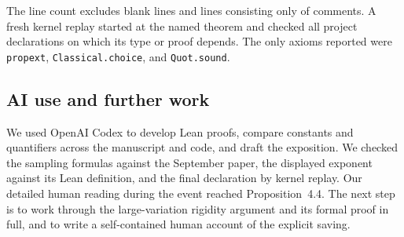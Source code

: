 \documentclass[11pt,letterpaper,oneside,reqno]{amsart}
\theoremstyle{definition}
\begin{document}
The line count excludes blank lines and lines consisting only of
comments. A fresh kernel replay started at the named theorem and checked
all project declarations on which its type or proof depends. The only
axioms reported were \texttt{propext}, \texttt{Classical.choice}, and
\texttt{Quot.sound}.

\subsection*{AI use and further work}
We used OpenAI Codex to develop Lean proofs, compare constants and
quantifiers across the manuscript and code, and draft the exposition.
We checked the sampling formulas against the September paper, the
displayed exponent against its Lean definition, and the final declaration
by kernel replay. Our detailed human reading during the event reached
Proposition~4.4. The next step is to work through the large-variation
rigidity argument and its formal proof in full, and to write a
self-contained human account of the explicit saving.
\end{document}
